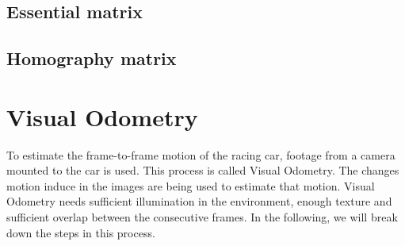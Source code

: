 \subsection{Essential matrix}

\subsection{Homography matrix}

\section{Visual Odometry}
To estimate the frame-to-frame motion of the racing car, footage from a camera mounted to the car is used. This process is called Visual Odometry. The changes motion induce in the images are being used to estimate that motion. Visual Odometry needs sufficient illumination in the environment, enough texture and sufficient overlap between the consecutive frames. In the following, we will break down the steps in this process.



